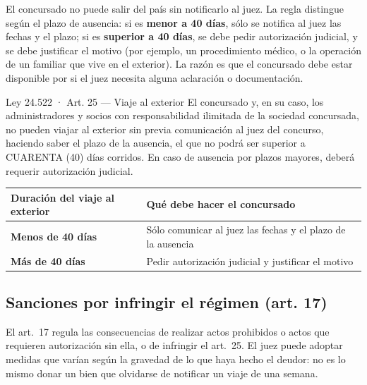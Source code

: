 \documentclass[12pt,oneside]{book}
\begin{document}
El concursado no puede salir del país sin notificarlo al juez. La regla distingue según el plazo de ausencia: si es \textbf{menor a 40 días}, sólo se notifica al juez las fechas y el plazo; si es \textbf{superior a 40 días}, se debe pedir autorización judicial, y se debe justificar el motivo (por ejemplo, un procedimiento médico, o la operación de un familiar que vive en el exterior). La razón es que el concursado debe estar disponible por si el juez necesita alguna aclaración o documentación.

\begin{norma}{Ley 24.522 · Art. 25 — Viaje al exterior}
El concursado y, en su caso, los administradores y socios con responsabilidad ilimitada de la sociedad concursada, no pueden viajar al exterior sin previa comunicación al juez del concurso, haciendo saber el plazo de la ausencia, el que no podrá ser superior a CUARENTA (40) días corridos. En caso de ausencia por plazos mayores, deberá requerir autorización judicial.
\end{norma}

\begingroup
\small
\renewcommand{\arraystretch}{1.25}
\begin{tabularx}{\textwidth}{>{\raggedright\arraybackslash}p{} Y}
\toprule
\textbf{Duración del viaje al exterior} & \textbf{Qué debe hacer el concursado} \\
\midrule
\textbf{Menos de 40 días} & Sólo comunicar al juez las fechas y el plazo de la ausencia \\
\textbf{Más de 40 días} & Pedir autorización judicial y justificar el motivo \\
\bottomrule
\end{tabularx}
\endgroup

\subsection{Sanciones por infringir el régimen (art. 17)}

El art.~17 regula las consecuencias de realizar actos prohibidos o actos que requieren autorización sin ella, o de infringir el art.~25. El juez puede adoptar medidas que varían según la gravedad de lo que haya hecho el deudor: no es lo mismo donar un bien que olvidarse de notificar un viaje de una semana.
\end{document}
